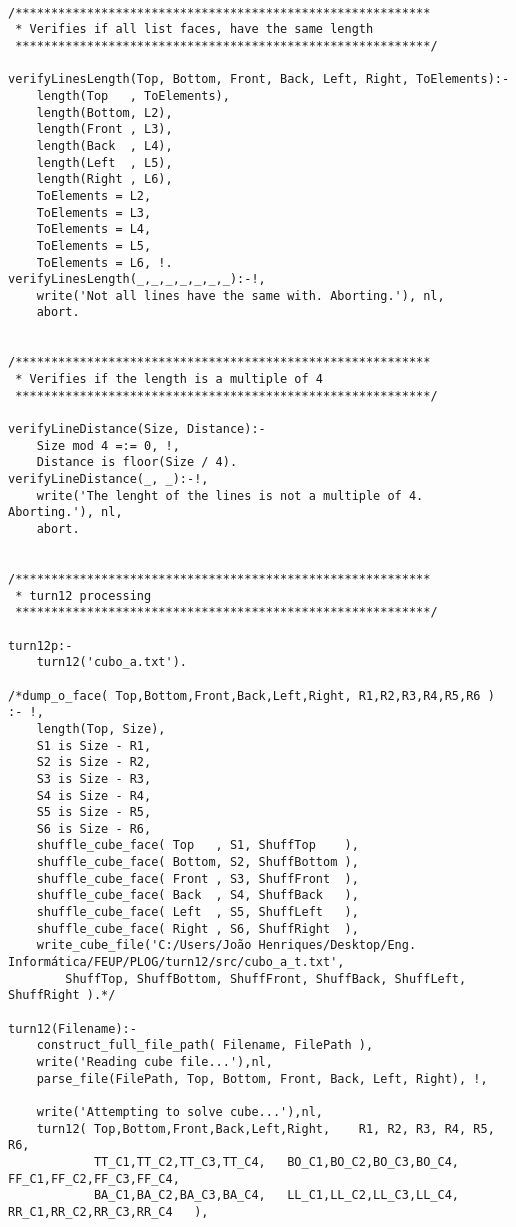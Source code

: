 \begin{lstlisting}
	
/**********************************************************
 * Verifies if all list faces, have the same length
 **********************************************************/
 
verifyLinesLength(Top, Bottom, Front, Back, Left, Right, ToElements):-
	length(Top   , ToElements),
	length(Bottom, L2),
	length(Front , L3),
	length(Back  , L4),
	length(Left  , L5),
	length(Right , L6),
	ToElements = L2,
	ToElements = L3,
	ToElements = L4,
	ToElements = L5,
	ToElements = L6, !.
verifyLinesLength(_,_,_,_,_,_,_):-!,
	write('Not all lines have the same with. Aborting.'), nl,
	abort.

	
/**********************************************************
 * Verifies if the length is a multiple of 4
 **********************************************************/
 
verifyLineDistance(Size, Distance):-
	Size mod 4 =:= 0, !,
	Distance is floor(Size / 4).
verifyLineDistance(_, _):-!,
	write('The lenght of the lines is not a multiple of 4. Aborting.'), nl,
	abort.

	
/**********************************************************
 * turn12 processing
 **********************************************************/
 
turn12p:-
	turn12('cubo_a.txt').
 
/*dump_o_face( Top,Bottom,Front,Back,Left,Right, R1,R2,R3,R4,R5,R6 ) :- !,
	length(Top, Size),
	S1 is Size - R1,
	S2 is Size - R2,
	S3 is Size - R3,
	S4 is Size - R4,
	S5 is Size - R5,
	S6 is Size - R6,
	shuffle_cube_face( Top   , S1, ShuffTop    ),
	shuffle_cube_face( Bottom, S2, ShuffBottom ),
	shuffle_cube_face( Front , S3, ShuffFront  ),
	shuffle_cube_face( Back  , S4, ShuffBack   ),
	shuffle_cube_face( Left  , S5, ShuffLeft   ),
	shuffle_cube_face( Right , S6, ShuffRight  ),
	write_cube_file('C:/Users/João Henriques/Desktop/Eng. Informática/FEUP/PLOG/turn12/src/cubo_a_t.txt',
		ShuffTop, ShuffBottom, ShuffFront, ShuffBack, ShuffLeft, ShuffRight ).*/

turn12(Filename):-
	construct_full_file_path( Filename, FilePath ),
	write('Reading cube file...'),nl,
	parse_file(FilePath, Top, Bottom, Front, Back, Left, Right), !,
	
	write('Attempting to solve cube...'),nl,
	turn12( Top,Bottom,Front,Back,Left,Right,    R1, R2, R3, R4, R5, R6,
			TT_C1,TT_C2,TT_C3,TT_C4,   BO_C1,BO_C2,BO_C3,BO_C4,    FF_C1,FF_C2,FF_C3,FF_C4,
			BA_C1,BA_C2,BA_C3,BA_C4,   LL_C1,LL_C2,LL_C3,LL_C4,    RR_C1,RR_C2,RR_C3,RR_C4   ),


\end{lstlisting}
